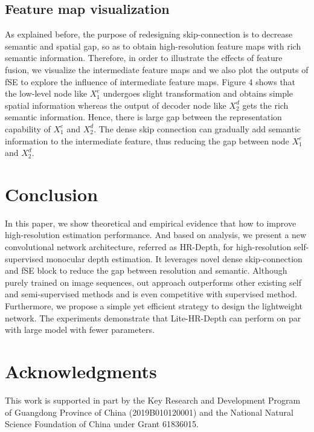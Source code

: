 \documentclass[letterpaper]{article} \usepackage{aaai21}  \usepackage{times}  \usepackage{helvet} \usepackage{courier}  \usepackage[hyphens]{url}  \usepackage{graphicx} \urlstyle{rm} \def\UrlFont{\rm}  \usepackage{natbib}  \usepackage{caption} \frenchspacing  \setlength{\pdfpagewidth}{8.5in}  \setlength{\pdfpageheight}{11in}  \usepackage{booktabs}
\begin{document}
\subsection{Feature map visualization}
As explained before, the purpose of redesigning skip-connection is to decrease semantic and spatial gap, so as to obtain high-resolution feature maps with rich semantic information. Therefore, in order to illustrate
the effects of feature fusion, we visualize the intermediate feature maps and we also plot the outputs of fSE to explore the influence of intermediate feature maps. Figure 4 shows that the low-level node like $X^{e}_1$ undergoes slight
transformation and obtains simple spatial information whereas the output of decoder node like $X^{d}_2$ gets the rich semantic information. Hence, there is large gap between the representation capability of $X^{e}_1$ and $X^{d}_2$.
The dense skip connection can gradually add semantic information to the intermediate feature, thus reducing the gap between node $X^{e}_1$ and $X^{d}_2$. 

\section{Conclusion}
In this paper, we show theoretical and empirical evidence that how to improve high-resolution estimation performance. And based on analysis, we present a new convolutional network architecture, referred as HR-Depth, for high-resolution 
self-supervised monocular depth estimation. It leverages novel dense skip-connection and fSE block to reduce the gap between resolution and semantic. Although purely trained on image sequences, out approach outperforms other existing 
self and semi-supervised methods and is even competitive with supervised method. Furthermore, we propose a simple yet efficient strategy to design the lightweight network. The experiments demonstrate that Lite-HR-Depth can perform on
par with large model with fewer parameters.

\section{Acknowledgments}
This work is supported in part by the Key Research and Development Program of Guangdong Province of China (2019B010120001) and the National Natural Science Foundation of China under Grant 61836015.

\end{document}
